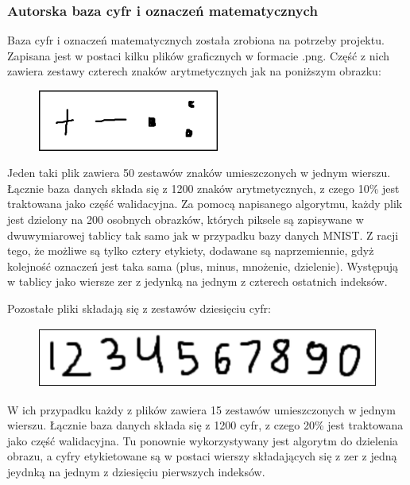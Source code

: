 \documentclass[12pt,a4paper]{article}
\begin{document}
	\newpage
	\subsubsection*{Autorska baza cyfr i oznaczeń matematycznych}
	\hspace{20pt} Baza cyfr i oznaczeń matematycznych została zrobiona na potrzeby projektu. Zapisana jest w postaci kilku plików graficznych w formacie .png. Część z nich zawiera zestawy czterech znaków arytmetycznych jak na poniższym obrazku:
	\begin{figure}[h!]
	\centering
	\includegraphics[height = 2cm]{graphics/data1.png} 
	\end{figure}	 
	
	Jeden taki plik zawiera 50 zestawów znaków umieszczonych w jednym wierszu. Łącznie baza danych składa się z 1200 znaków arytmetycznych, z czego 10\%  jest traktowana jako część walidacyjna. Za pomocą napisanego algorytmu, każdy plik jest dzielony na 200 osobnych obrazków, których piksele są zapisywane w dwuwymiarowej tablicy tak samo jak w przypadku bazy danych MNIST. Z racji tego, że możliwe są tylko cztery etykiety, dodawane są naprzemiennie, gdyż kolejność oznaczeń jest taka sama (plus, minus, mnożenie, dzielenie). Występują w tablicy jako wiersze zer z jedynką na jednym z czterech ostatnich indeksów. 
	
	\vspace{20 pt}
	Pozostałe pliki składają się z zestawów dziesięciu cyfr:
    \begin{figure}[h!]
	\centering
	\includegraphics[height = 2cm]{graphics/data2.png} 
	\end{figure}
	
		W ich przypadku każdy z plików zawiera 15 zestawów umieszczonych w jednym wierszu. Łącznie baza danych składa się z 1200 cyfr, z czego 20\%  jest traktowana jako część walidacyjna. Tu ponownie wykorzystywany jest algorytm do dzielenia obrazu, a cyfry etykietowane są w postaci wierszy składających się z zer z jedną jeydnką na jednym z dziesięciu pierwszych indeksów.
		
\end{document}
